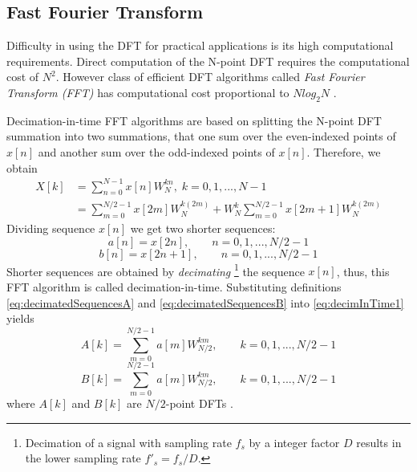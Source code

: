 \documentclass[twoside]{ctuthesis}
\theoremstyle{plain}
\theoremstyle{definition}
\theoremstyle{note}
\begin{document}
\subsection{Fast Fourier Transform}
\label{sec:FFT}
Difficulty in using the DFT for practical applications is its high computational requirements. Direct computation of the N-point DFT requires the computational cost of $N^2$. However class of efficient DFT algorithms called \textit{Fast Fourier Transform (FFT)} has computational cost proportional to $Nlog_{2}N$ \cite{cite:RT_DSP,cite:3}.
\par 
Decimation-in-time FFT algorithms are based on splitting the N-point DFT summation into two summations, that one sum over the even-indexed points of $x[n]$ and another sum over the odd-indexed points of $x[n]$.
Therefore, we obtain
\begin{equation} \label{eq:decimInTime1}
	\begin{aligned}
		X[k] &= \sum_{n=0}^{N-1}x[n]W^{kn}_{N}, \; k=0,1,...,N-1\\
		&= \sum_{m=0}^{N/2-1}x[2m]W^{k(2m)}_{N} + W^{k}_{N}\sum_{m=0}^{N/2-1}x[2m+1]W^{k(2m)}_{N}
	\end{aligned}
\end{equation}
Dividing sequence $x[n]$ we get two shorter sequences:
\begin{equation} \label{eq:decimatedSequencesA}
	a[n]=x[2n],\qquad n=0, 1, ..., N/2 -1
\end{equation}
\begin{equation} \label{eq:decimatedSequencesB}
	b[n]=x[2n+1],\qquad n=0, 1, ..., N/2 -1
\end{equation}
Shorter sequences are obtained by \textit{decimating}
\footnote{Decimation of a signal with sampling rate $f_{s}$ by a integer factor $D$ results in the lower sampling rate $f'_{s}=f_{s}/D$.}
the sequence $x[n]$, thus, this FFT algorithm is called decimation-in-time.
Substituting definitions \ref{eq:decimatedSequencesA} and \ref{eq:decimatedSequencesB} into \ref{eq:decimInTime1} yields
\begin{equation} \label{eq:fft2_A}
	A[k]=\sum_{m=0}^{N/2-1}a[m]W^{km}_{N/2},\qquad k=0, 1, ..., N/2 -1
\end{equation}
\begin{equation} \label{eq:fft2_B}
	B[k]=\sum_{m=0}^{N/2-1}a[m]W^{km}_{N/2},\qquad k=0, 1, ..., N/2 -1
\end{equation}
where $A[k]$ and $B[k]$ are $N/2$-point DFTs \cite{cite:3,cite:2}.
\end{document}
